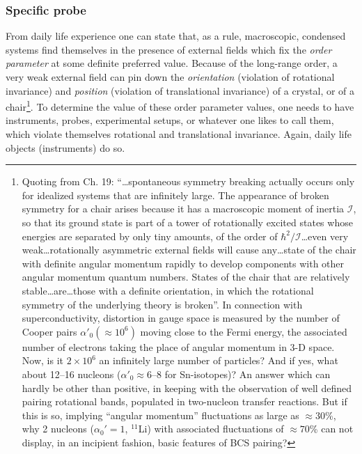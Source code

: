 \subsubsection{Specific probe}
From daily life experience one can state that, as a rule, macroscopic, condensed systems find themselves in the presence of external fields which fix the \textit{order parameter} at some definite preferred value. Because of the long-range order, a very weak external field can pin down the \textit{orientation} (violation of rotational invariance) and \textit{position} (violation of translational invariance) of a crystal, or of a chair\footnote{Quoting from \cite{Weinberg:96b} Ch. 19: ``\dots spontaneous symmetry breaking actually occurs only for idealized systems that are infinitely large. The appearance of broken symmetry for a chair arises because it has a macroscopic moment of inertia $\mathcal I$, so that its ground state is part of a tower of rotationally excited states whose energies are separated by only tiny amounts, of the order of $\hbar^2/\mathcal I$\dots even very weak\dots rotationally asymmetric external fields will cause any\dots state of the chair with definite angular momentum rapidly to develop components with other angular momentum quantum numbers. States of the chair that are relatively stable\dots are\dots those with a definite orientation, in which the rotational symmetry of the underlying theory is broken''. In connection with superconductivity, distortion in gauge space is measured by the number of Cooper pairs   $\alpha'_0(\approx10^6)$ 
	 moving close to the Fermi energy, the associated number of electrons taking the place of angular momentum in 3-D space. Now, is it $2\times10^6$ an infinitely large number of particles? And if yes, what about 12--16 nucleons ($\alpha'_0\approx6$--8 for Sn-isotopes)? An answer which can hardly be other than positive, in keeping with the observation of well defined pairing rotational bands, populated in two-nucleon transfer reactions. But if this is so, implying ``angular momentum'' fluctuations as large as $\approx30$\%, why 2 nucleons ($\alpha_0'=1$, $^{11}$Li) with associated fluctuations of $\approx70$\% can not display, in an incipient fashion, basic features of BCS pairing?}.  To determine the value of these order parameter values, one needs to have instruments, probes, experimental setups, or whatever one likes to call them, which violate themselves rotational and translational invariance. Again, daily life objects (instruments) do so.


